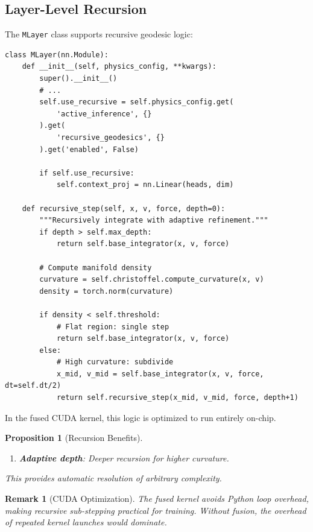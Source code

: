 \documentclass[12pt,letterpaper,twoside]{article}
\newtheorem{remarque}{Remark}[section]
\newtheorem{prop}{Proposition}[section]
\begin{document}
\subsection{Layer-Level Recursion}

The \texttt{MLayer} class supports recursive geodesic logic:

\begin{verbatim}
class MLayer(nn.Module):
    def __init__(self, physics_config, **kwargs):
        super().__init__()
        # ...
        self.use_recursive = self.physics_config.get(
            'active_inference', {}
        ).get(
            'recursive_geodesics', {}
        ).get('enabled', False)
        
        if self.use_recursive:
            self.context_proj = nn.Linear(heads, dim)
    
    def recursive_step(self, x, v, force, depth=0):
        """Recursively integrate with adaptive refinement."""
        if depth > self.max_depth:
            return self.base_integrator(x, v, force)
        
        # Compute manifold density
        curvature = self.christoffel.compute_curvature(x, v)
        density = torch.norm(curvature)
        
        if density < self.threshold:
            # Flat region: single step
            return self.base_integrator(x, v, force)
        else:
            # High curvature: subdivide
            x_mid, v_mid = self.base_integrator(x, v, force, dt=self.dt/2)
            return self.recursive_step(x_mid, v_mid, force, depth+1)
\end{verbatim}

In the fused CUDA kernel, this logic is optimized to run entirely on-chip.

\begin{prop}[Recursion Benefits]
\begin{enumerate}
\item \textbf{Adaptive depth}: Deeper recursion for higher curvature.
\end{enumerate}
This provides automatic resolution of arbitrary complexity.
\end{prop}

\begin{remarque}[CUDA Optimization]
The fused kernel avoids Python loop overhead, making recursive sub-stepping practical for training. Without fusion, the overhead of repeated kernel launches would dominate.
\end{remarque}
\end{document}
